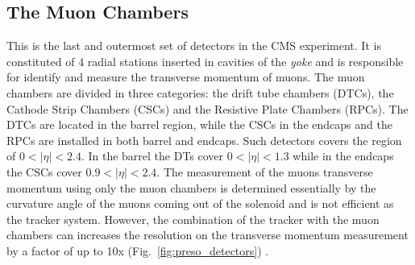 \subsection{The Muon Chambers}
This is the last and outermost set of detectors in the CMS experiment. It is constituted of 4 radial stations inserted in cavities of the \textit{yoke} and is responsible for identify and measure the transverse momentum of muons. The muon chambers are divided in three categories: the drift tube chambers (DTCs), the Cathode Strip Chambers (CSCs) and the Resistive Plate Chambers (RPCs). The DTCs are located in the barrel region, while the CSCs in the endcaps and the RPCs are installed in both barrel and endcaps. Such detectors covers the region of $0 < |\eta| < 2.4$. In the barrel the DTs cover $0 < |\eta| < 1.3$ while in the endcaps the CSCs cover $0.9 < |\eta| < 2.4$. The measurement of the muons transverse momentum using only the muon chambers is determined essentially by the curvature angle of the muons coming out of the solenoid and is not efficient as the tracker system. However, the combination of the tracker with the muon chambers can increases the resolution on the transverse momentum measurement by a factor of up to 10x (Fig.~\ref{fig:preso_detectors}) \cite{bib:CMS-PTDR-2006,bib:CMS-MSTDR-1997}.

